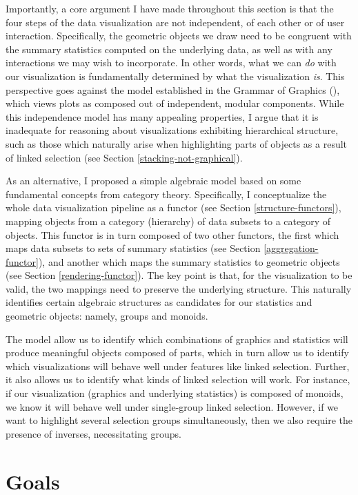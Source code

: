 \documentclass[
  openany]{book}
\theoremstyle{definition}
\theoremstyle{definition}
\theoremstyle{definition}
\theoremstyle{definition}
\theoremstyle{remark}
\begin{document}
Importantly, a core argument I have made throughout this section is that the four steps of the data visualization are not independent, of each other or of user interaction. Specifically, the geometric objects we draw need to be congruent with the summary statistics computed on the underlying data, as well as with any interactions we may wish to incorporate. In other words, what we can \emph{do} with our visualization is fundamentally determined by what the visualization \emph{is}. This perspective goes against the model established in the Grammar of Graphics (), which views plots as composed out of independent, modular components. While this independence model has many appealing properties, I argue that it is inadequate for reasoning about visualizations exhibiting hierarchical structure, such as those which naturally arise when highlighting parts of objects as a result of linked selection (see Section \ref{stacking-not-graphical}).

As an alternative, I proposed a simple algebraic model based on some fundamental concepts from category theory. Specifically, I conceptualize the whole data visualization pipeline as a functor (see Section \ref{structure-functors}), mapping objects from a category (hierarchy) of data subsets to a category of objects. This functor is in turn composed of two other functors, the first which maps data subsets to sets of summary statistics (see Section \ref{aggregation-functor}), and another which maps the summary statistics to geometric objects (see Section \ref{rendering-functor}). The key point is that, for the visualization to be valid, the two mappings need to preserve the underlying structure. This naturally identifies certain algebraic structures as candidates for our statistics and geometric objects: namely, groups and monoids.

The model allow us to identify which combinations of graphics and statistics will produce meaningful objects composed of parts, which in turn allow us to identify which visualizations will behave well under features like linked selection. Further, it also allows us to identify what kinds of linked selection will work. For instance, if our visualization (graphics and underlying statistics) is composed of monoids, we know it will behave well under single-group linked selection. However, if we want to highlight several selection groups simultaneously, then we also require the presence of inverses, necessitating groups.

\chapter{Goals}\label{goals}
\end{document}

